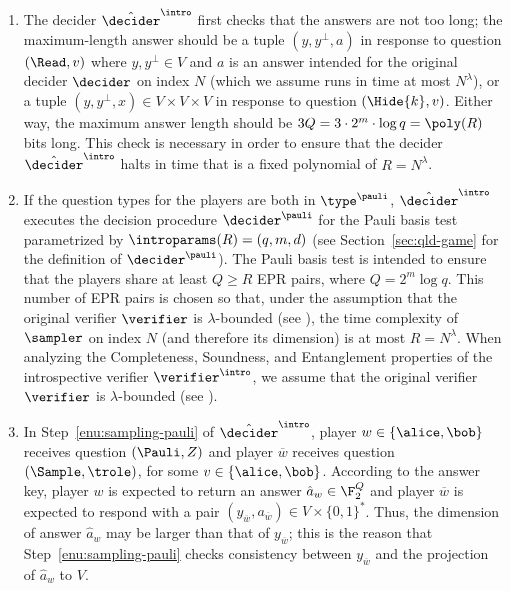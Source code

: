 \begin{enumerate}
\item The decider $\tdint$ first checks that the answers are not too
  long;  the maximum-length answer should be a tuple $(y, y^\perp, a)$ in response to question $(\Read,v)$ 
  where $y, y^\perp \in V$ and $a$ is an answer intended for the original
  decider $\decider$ on index $N$ (which we assume runs in time at most
  $N^\lambda$), or a tuple $(y,y^\perp,x) \in V \times V \times V$ in response to question $(\Hide{k},v)$. Either way, the maximum answer length should be $3Q = 3 \cdot 2^m \cdot \log q = \poly(R)$ bits long. 
  This check is necessary in order to ensure that the decider $\tdint$
  halts in time that is a fixed polynomial of $R = N^\lambda$.


\item If the question types for the players are both in $\type^\pauli$,
  $\tdint$ executes the decision procedure $\decider^\pauli$ for the
  Pauli basis test parametrized by $\introparams(R) = (q,m,d)$ (see
  Section~\ref{sec:qld-game} for the definition of $\decider^\pauli$).
   The Pauli basis test is intended to ensure that the players share at least $Q \geq R$ EPR pairs, where $Q = 2^m \log q$. This number of EPR pairs is chosen
  so that, under the assumption that the original verifier $\verifier$ is $\lambda$-bounded (see ), 
  the time complexity of $\sampler$ on index $N$ (and therefore its dimension) is at most $R = N^\lambda$. 
	When analyzing the Completeness, Soundness, and Entanglement properties of the introspective verifier $\verifier^\intro$,
	we assume that the original verifier $\verifier$ is $\lambda$-bounded (see ). 
   


\item In Step~\ref{enu:sampling-pauli} of $\tdint$, player
  $w\in\{\alice,\bob\}$ receives question $(\Pauli,Z)$ and player $\overline{w}$
  receives question $(\Sample,\trole)$, for some $v\in\{\alice,\bob\}$.
  According to the answer key, player $w$ is expected to return an answer
  $\hat{a}_w\in \F_2^Q$ and player $\overline{w}$ is expected to respond with a
  pair $(y_{\overline{w}},a_{\overline{w}}) \in V \times \{0,1\}^*$.
  Thus, the dimension of answer $\hat{a}_w$ may be larger than that of
  $y_{\overline{w}}$; this is the reason that Step~\ref{enu:sampling-pauli}
  checks consistency between $y_{\overline{w}}$ and the projection of
  $\hat{a}_w$ to $V$.




\end{enumerate}
